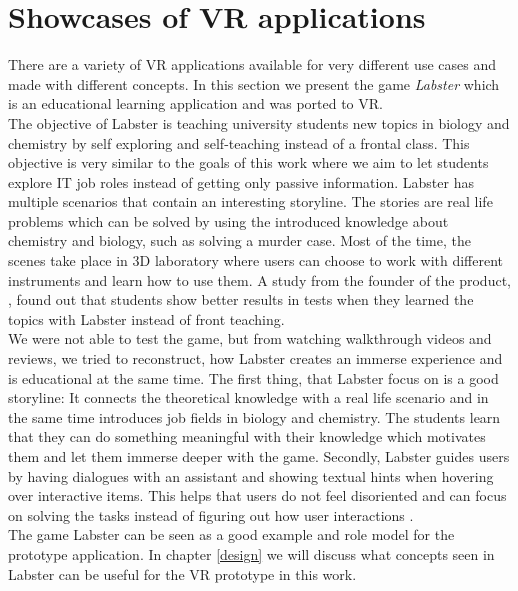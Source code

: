 \section{Showcases of VR applications}
\label{labster}
There are a variety of VR applications available for very different use cases and made with different concepts. In this section we present the game \textit{Labster} which is an educational learning application and was ported to VR.\\
The objective of Labster is teaching university students new topics in biology and chemistry by self exploring and self-teaching instead of a frontal class. This objective is very similar to the goals of this work where we aim to let students explore IT job roles instead of getting only passive information. Labster has multiple scenarios that contain an interesting storyline. The stories are real life problems which can be solved by using the introduced knowledge about chemistry and biology, such as solving a murder case. Most of the time, the scenes take place in 3D laboratory where users can choose to work with different instruments and learn how to use them. A study from the founder of the product, , found out that students show better results in tests when they learned the topics with Labster instead of front teaching. \cite{Bodekaer.October2015} \\
We were not able to test the game, but from watching walkthrough videos and reviews, we tried to reconstruct, how Labster creates an immerse experience and is educational at the same time.
The first thing, that Labster focus on is a good storyline: It connects the theoretical knowledge with a real life scenario and in the same time introduces job fields in biology and chemistry. The students learn that they can do something meaningful with their knowledge which motivates them and let them immerse deeper with the game. Secondly, Labster guides users by having dialogues with an assistant and showing textual hints when hovering over interactive items. This helps that users do not feel disoriented and can focus on solving the tasks instead of figuring out how user interactions .\\
The game Labster can be seen as a good example and role model for the prototype application. In chapter \ref{design} we will discuss what concepts seen in Labster can be useful for the VR prototype in this work.
